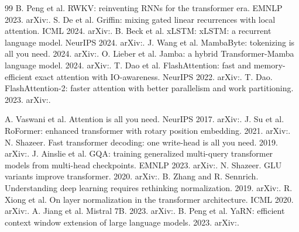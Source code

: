 \documentclass[11pt,a4paper]{article}
\theoremstyle{plain}
\theoremstyle{definition}
\theoremstyle{remark}
\begin{document}
\begin{thebibliography}{99}
 B. Peng et al. RWKV: reinventing RNNs for the transformer era. EMNLP 2023. arXiv:.
 S. De et al. Griffin: mixing gated linear recurrences with local attention. ICML 2024. arXiv:.
 B. Beck et al. xLSTM: xLSTM: a recurrent language model. NeurIPS 2024. arXiv:.
 J. Wang et al. MambaByte: tokenizing is all you need. 2024. arXiv:.
 O. Lieber et al. Jamba: a hybrid Transformer-Mamba language model. 2024. arXiv:.
 T. Dao et al. FlashAttention: fast and memory-efficient exact attention with IO-awareness. NeurIPS 2022. arXiv:.
 T. Dao. FlashAttention-2: faster attention with better parallelism and work partitioning. 2023. arXiv:.

 A. Vaswani et al. Attention is all you need. NeurIPS 2017. arXiv:.
 J. Su et al. RoFormer: enhanced transformer with rotary position embedding. 2021. arXiv:.
 N. Shazeer. Fast transformer decoding: one write-head is all you need. 2019. arXiv:.
 J. Ainslie et al. GQA: training generalized multi-query transformer models from multi-head checkpoints. EMNLP 2023. arXiv:.
 N. Shazeer. GLU variants improve transformer. 2020. arXiv:.
 B. Zhang and R. Sennrich. Understanding deep learning requires rethinking normalization. 2019. arXiv:.
 R. Xiong et al. On layer normalization in the transformer architecture. ICML 2020. arXiv:.
 A. Jiang et al. Mistral 7B. 2023. arXiv:.
 B. Peng et al. YaRN: efficient context window extension of large language models. 2023. arXiv:.


\end{thebibliography}
\end{document}
